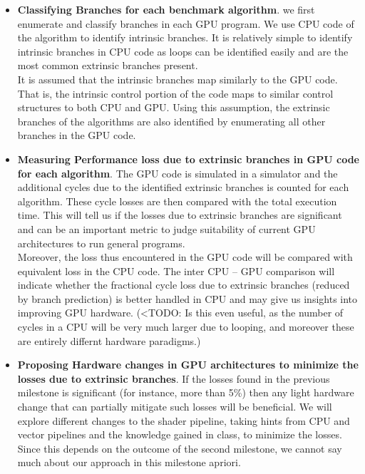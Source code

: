 \begin{itemize}

\item \textbf{Classifying Branches for each benchmark algorithm}. we first enumerate and classify branches in each GPU program. We use CPU code of the algorithm to identify intrinsic branches. It is relatively simple to identify intrinsic branches in CPU code as loops can be identified easily and are the most common extrinsic branches present.
\\
It is assumed that the intrinsic branches map similarly to the GPU code. That is, the intrinsic control portion of the code maps to similar control structures to both CPU and GPU. Using this assumption, the extrinsic branches of the algorithms are also identified by enumerating all other branches in the GPU code.

\item \textbf{Measuring Performance loss due to extrinsic branches in GPU code for each algorithm}. The GPU code is simulated in a simulator and the additional cycles due to the identified extrinsic branches is counted for each algorithm. These cycle losses are then compared with the total execution time. This will tell us if the losses due to extrinsic branches are significant and can be an important metric to judge suitability of current GPU architectures to run general programs.
\\
Moreover, the loss thus encountered in the GPU code will be compared with equivalent loss in the CPU code. The inter CPU -- GPU comparison will indicate whether the fractional cycle loss due to extrinsic branches (reduced by branch prediction) is better handled in CPU and may give us insights into improving GPU hardware. (<TODO: Is this even useful, as the number of cycles in a CPU will be very much larger due to looping, and moreover these are entirely differnt hardware paradigms.)

\item \textbf{Proposing Hardware changes in GPU architectures to minimize the losses due to extrinsic branches}. If the losses found in the previous milestone is significant (for instance, more than 5\%) then any light hardware change that can partially mitigate such losses will be beneficial. We will explore different changes to the shader pipeline, taking hints from CPU and vector pipelines and the knowledge gained in class, to minimize the losses. Since this depends on the outcome of the second milestone, we cannot say much about our approach in this milestone apriori. 

\end{itemize}
